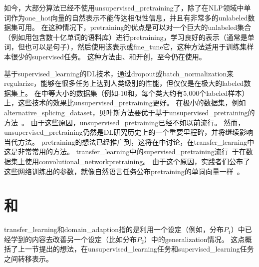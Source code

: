 如今，大部分算法已经不使用\gls{unsupervised_pretraining}了，除了在\gls{NLP}领域中单词作为\gls{one_hot}向量的自然表示不能传达相似性信息，并且有非常多的\gls{unlabeled}数据集可用。
在这种情况下，\gls{pretraining}的优点是可以对一个巨大的\gls{unlabeled}集合（例如用包含数十亿单词的语料库）进行\gls{pretraining}，学习良好的表示（通常是单词，但也可以是句子），然后使用该表示或\gls{fine_tune}它，这种方法适用于训练集样本很少的\gls{supervised}任务。
这种方法由\cite{CollobertR2008-small}、\cite{Turian+Ratinov+Bengio-2010-small}和\cite{collobert2011natural}开创，至今仍在使用。



基于\gls{supervised_learning}的\gls{DL}技术，通过\gls{dropout}或\gls{batch_normalization}来\gls{regularize}，能够在很多任务上达到人类级别的性能，但仅仅是在极大的\gls{labeled}数据集上。
在中等大小的数据集（例如-10和，每个类大约有5,000个\gls{labeled}样本）上，这些技术的效果比\gls{unsupervised_pretraining}更好。
在极小的数据集，例如\gls{alternative_splicing_dataset}，贝叶斯方法要优于基于\gls{unsupervised_pretraining}的方法~\citep{Srivastava-master-small}。
由于这些原因，\gls{unsupervised_pretraining}已经不如以前流行。
然而，\gls{unsupervised_pretraining}仍然是\gls{DL}研究历史上的一个重要里程碑，并将继续影响当代方法。
\gls{pretraining}的想法已经推广到，这将在中讨论，在\gls{transfer_learning}中这是非常常用的方法。
\gls{transfer_learning}中的\gls{supervised_pretraining}流行~\citep{Oquab-et-al-CVPR2014,yosinski-nips2014}于在数据集上使用\gls{convolutional_network}\gls{pretraining}。
由于这个原因，实践者们公布了这些网络训练出的参数，就像自然语言任务公布\gls{pretraining}的单词向量一样~\citep{collobert2011natural,Mikolov-et-al-ICLR2013}。


\section{和}
\label{sec:transfer_learning_and_domain_adaptation}
\gls{transfer_learning}和\gls{domain_adaption}指的是利用一个设定（例如，分布$P_1$）中已经学到的内容去改善另一个设定（比如分布$P_2$）中的\gls{generalization}情况。
这点概括了上一节提出的想法，在\gls{unsupervised_learning}任务和\gls{supervised_learning}任务之间转移表示。


